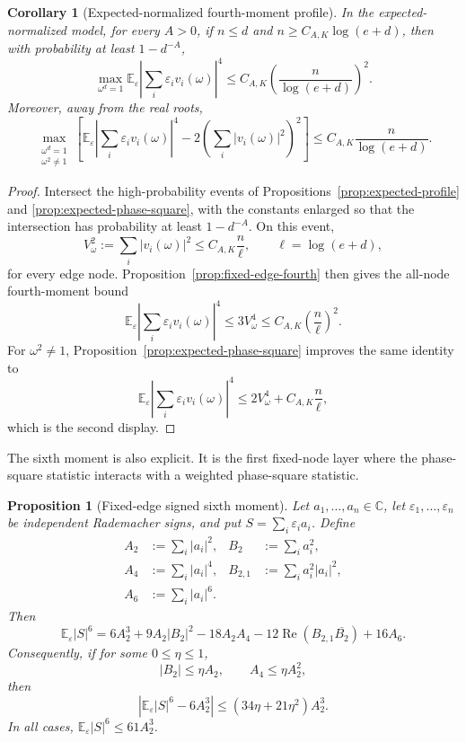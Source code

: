 \documentclass[11pt]{amsart}
\numberwithin{equation}{section}
\newtheorem{proposition}[theorem]{Proposition}
\newtheorem{corollary}[theorem]{Corollary}
\theoremstyle{definition}
\theoremstyle{remark}
\newcommand{\C}{\mathbb C}
\newcommand{\Exp}{\mathbb E}
\newcommand{\eps}{\varepsilon}
\begin{document}
\begin{corollary}[Expected-normalized fourth-moment profile]
\label{cor:expected-fourth-profile}
In the expected-normalized model, for every \(A>0\), if \(n\le d\) and
\(n\ge C_{A,K}\log(e+d)\), then with probability at least \(1-d^{-A}\),
\[
  \max_{\omega^d=1}
  \Exp_\eps\left|\sum_i\eps_i v_i(\omega)\right|^4
  \le C_{A,K}\left(\frac{n}{\log(e+d)}\right)^2 .
\]
Moreover, away from the real roots,
\[
  \max_{\substack{\omega^d=1\\ \omega^2\ne1}}
  \left[
  \Exp_\eps\left|\sum_i\eps_i v_i(\omega)\right|^4
  -2\left(\sum_i|v_i(\omega)|^2\right)^2
  \right]
  \le C_{A,K}\frac{n}{\log(e+d)} .
\]
\end{corollary}

\begin{proof}
Intersect the high-probability events of
Propositions~\ref{prop:expected-profile} and \ref{prop:expected-phase-square},
with the constants enlarged so that the intersection has probability at least
\(1-d^{-A}\).  On this event,
\[
  V_\omega^2:=\sum_i|v_i(\omega)|^2
  \le C_{A,K}\frac n\ell,\qquad \ell=\log(e+d),
\]
for every edge node.  Proposition~\ref{prop:fixed-edge-fourth} then gives the
all-node fourth-moment bound
\[
  \Exp_\eps\left|\sum_i\eps_i v_i(\omega)\right|^4
  \le 3V_\omega^4
  \le C_{A,K}\left(\frac n\ell\right)^2 .
\]
For \(\omega^2\ne1\), Proposition~\ref{prop:expected-phase-square} improves the
same identity to
\[
  \Exp_\eps\left|\sum_i\eps_i v_i(\omega)\right|^4
  \le 2V_\omega^4+C_{A,K}\frac n\ell,
\]
which is the second display.
\end{proof}

The sixth moment is also explicit.  It is the first fixed-node layer where the
phase-square statistic interacts with a weighted phase-square statistic.

\begin{proposition}[Fixed-edge signed sixth moment]
\label{prop:fixed-edge-sixth}
Let \(a_1,\ldots,a_n\in\C\), let \(\eps_1,\ldots,\eps_n\) be independent
Rademacher signs, and put \(S=\sum_i\eps_i a_i\).  Define
\[
  \begin{aligned}
  A_2&:=\sum_i|a_i|^2,
  &B_2&:=\sum_i a_i^2,\\
  A_4&:=\sum_i|a_i|^4,
  &B_{2,1}&:=\sum_i a_i^2|a_i|^2,\\
  A_6&:=\sum_i|a_i|^6 .
  \end{aligned}
\]
Then
\[
  \Exp_\eps |S|^6
  =
  6A_2^3+9A_2|B_2|^2
  -18A_2A_4
  -12\operatorname{Re}(B_{2,1}\overline{B_2})
  +16A_6 .
\]
Consequently, if for some \(0\le\eta\le1\),
\[
  |B_2|\le \eta A_2,\qquad A_4\le \eta A_2^2,
\]
then
\[
  \left|\Exp_\eps |S|^6-6A_2^3\right|
  \le (34\eta+21\eta^2)A_2^3 .
\]
In all cases, \(\Exp_\eps |S|^6\le 61A_2^3\).
\end{proposition}
\end{document}
